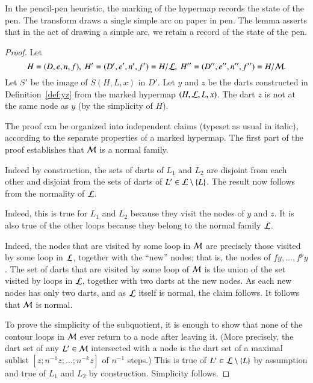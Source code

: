 In the pencil-pen heuristic, the marking of the hypermap records the
state of the pen.  The transform draws a single simple arc on paper in
pen.  The lemma asserts that in the act of drawing a simple arc, we
retain a record of the state of the pen.

\begin{proof} Let 
\[ 
H=(D,e,n,f),\   H' =(D',e',n',f') = H/{\cal
    L},\  H'' = (D'',e'',n'',f'') = H/{\cal M}.   
\] 
Let $S'$ be the image of $S(H,L,x)$ in $D'$.  Let $y$ and $z$ be the darts
constructed in Definition~\ref{def:yz} from the marked hypermap $(H,{\cal
  L},L,x)$.  The dart $z$ is not at the same node as $y$ (by
the simplicity of $H$).

The proof can be organized into independent claims (typeset as usual in italic), according to the
separate properties of a marked hypermap.  The first part of the proof
establishes that ${\cal M}$ is a normal family.


 
Indeed by construction, the sets of darts of $L_1$ and $L_2$ are
disjoint from each other and disjoint from the sets of darts of $L'\in
{\cal L}\setminus \{L\}$.  The result now follows from the normality
of ${\cal L}$.

   Indeed, this
is true for $L_1$ and $L_2$ because they visit the nodes of $y$ and
$z$.  It is also true of the other loops because they belong to the
normal family ${\cal L}$. 

  
Indeed, the nodes that are visited by some loop in ${\cal M}$ are
precisely those visited by some loop in ${\cal L}$, together with the
``new'' nodes; that is, the nodes of $f y,\ldots,f^p y$.  The set of
darts that are visited by some loop of ${\cal M}$ is the union of the
set visited by loops in ${\cal L}$, together with two darts at the
new nodes.  As each new nodes has only two darts, and as ${\cal L}$ itself
is normal, the claim follows. It follows that ${\cal M}$ is normal.  


 To prove the simplicity of the subquotient, it is enough
to show that none of the contour loops in ${\cal M}$ ever return to a
node after leaving it.  (More precisely, the dart set of any
$L'\in{\cal M}$ intersected with a node is the dart set of a maximal
sublist $[z;n^{-1}z;\ldots;n^{-k}z]$ of $n^{-1}$ steps.)  This is true
of $L'\in{\cal L}\setminus\{L\}$ by assumption and true of $L_1$ and
$L_2$ by construction.  Simplicity follows.


\end{proof}

